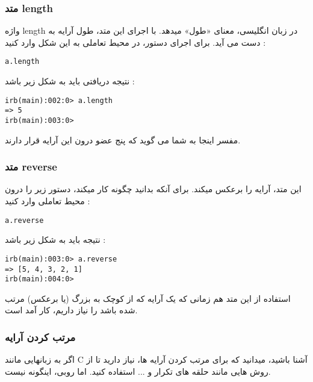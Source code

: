 \documentclass[11pt]{article}
\begin{document}
\subsubsection{متد length}
واژه length در زبان انگلیسی، معنای «طول» میدهد. با اجرای این متد، طول آرایه به دست می آید. برای اجرای دستور، در محیط تعاملی به این شکل وارد کنید :
\begin{latin}
\begin{verbatim}
a.length
\end{verbatim}
\end{latin}
نتیجه دریافتی باید به شکل زیر باشد :
\begin{latin}
\begin{verbatim}
irb(main):002:0> a.length
=> 5
irb(main):003:0>
\end{verbatim}
\end{latin}
مفسر اینجا به شما می گوید که پنج عضو درون این آرایه قرار دارند. 
\subsubsection{متد reverse}
این متد، آرایه را برعکس میکند. برای آنکه بدانید چگونه کار میکند، دستور زیر را درون محیط تعاملی وارد کنید :
\begin{latin}
\begin{verbatim}
a.reverse
\end{verbatim}
\end{latin}
نتیجه باید به شکل زیر باشد :
\begin{latin}
\begin{verbatim}
irb(main):003:0> a.reverse
=> [5, 4, 3, 2, 1]
irb(main):004:0> 
\end{verbatim}
\end{latin}
استفاده از این متد هم زمانی که یک آرایه که از کوچک به بزرگ (یا برعکس) مرتب شده باشد را نیاز داریم، کار آمد است. 
\subsubsection{مرتب کردن آرایه}
اگر به زبانهایی مانند C آشنا باشید، میدانید که برای مرتب کردن آرایه ها، نیاز دارید تا از روش هایی مانند حلقه های تکرار و ... استفاده کنید. اما روبی، اینگونه نیست. 
\end{document}

